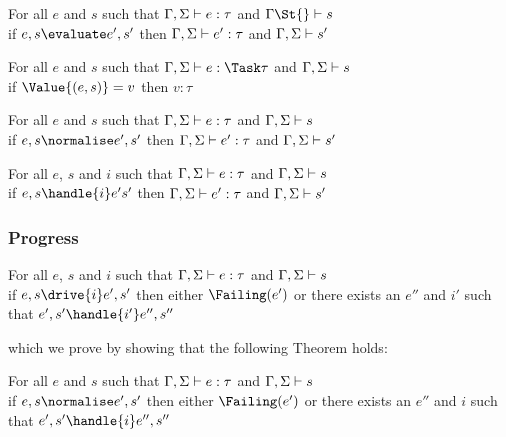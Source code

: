\begin{theorem}
      For all $e$ and $s$ such that
      $\Gamma,\Sigma\vdash e:\tau$ and $\Gamma\St{}\infers s$\\
      if $e,s\evaluate e',s'$
      then $\Gamma,\Sigma\vdash e':\tau$ and $\Gamma,\Sigma\vdash s'$
      \label{thmpreseval}
\end{theorem}

\begin{lemma}
  For all $e$ and $s$ such that $\Gamma,\Sigma\infers e:\Task\tau$ and $\Gamma,\Sigma\vdash s$\\
  if $\Value{(e,s)}=v$ then $v:\tau$
  \label{lemmavaluepreserves}
\end{lemma}

\begin{theorem}
    For all $e$ and $s$ such that $\Gamma,\Sigma\vdash e:\tau$ and $\Gamma,\Sigma\vdash s$\\
    if   $e,s \normalise e',s'$ then $\Gamma,\Sigma\vdash e':\tau$ and $\Gamma,\Sigma\vdash s'$
    \label{thmpresnorm}
\end{theorem}

\begin{theorem}
  For all $e$, $s$ and $i$ such that $\Gamma,\Sigma\vdash e:\tau$ and $\Gamma,\Sigma\vdash s$\\
  if $ e,s \handle{i} e's'$ then $\Gamma,\Sigma\vdash e':\tau$ and $\Gamma,\Sigma\vdash s'$
   \label{thmpreshandle}
\end{theorem}

\subsubsection{Progress}

\begin{theorem}
 For all $e$, $s$ and $i$ such that $\Gamma,\Sigma\vdash e:\tau$ and $\Gamma,\Sigma\vdash s$\\
 if $e,s \drive{i} e',s'$ then either $\Failing(e')$ or there exists an $e''$ and $i'$ such that $e',s'\handle{i'}e'',s''$
\end{theorem}

which we prove by showing that the following Theorem holds:
\begin{theorem}
  For all $e$ and $s$ such that $\Gamma,\Sigma\vdash e:\tau$ and $\Gamma,\Sigma\vdash s$\\
  if $e,s \normalise e',s'$ then either $\Failing(e')$ or there exists an $e''$ and $i$ such that $e',s'\handle{i}e'',s''$
  \label{thmprogressnorm}
\end{theorem}

